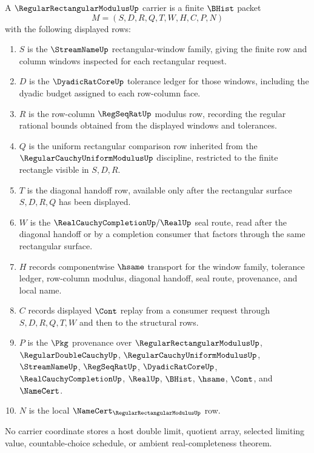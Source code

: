 \begin{definition}
\label{def:regular-rectangular-modulus-carrier}
A $\RegularRectangularModulusUp$ carrier is a finite $\BHist$ packet
$$
M=(S,D,R,Q,T,W,H,C,P,N)
$$
with the following displayed rows:
\begin{enumerate}
\item $S$ is the $\StreamNameUp$ rectangular-window family, giving the finite row and column windows inspected for each rectangular request.
\item $D$ is the $\DyadicRatCoreUp$ tolerance ledger for those windows, including the dyadic budget assigned to each row-column face.
\item $R$ is the row-column $\RegSeqRatUp$ modulus row, recording the regular rational bounds obtained from the displayed windows and tolerances.
\item $Q$ is the uniform rectangular comparison row inherited from the $\RegularCauchyUniformModulusUp$ discipline, restricted to the finite rectangle visible in $S,D,R$.
\item $T$ is the diagonal handoff row, available only after the rectangular surface $S,D,R,Q$ has been displayed.
\item $W$ is the $\RealCauchyCompletionUp/\RealUp$ seal route, read after the diagonal handoff or by a completion consumer that factors through the same rectangular surface.
\item $H$ records componentwise $\hsame$ transport for the window family, tolerance ledger, row-column modulus, diagonal handoff, seal route, provenance, and local name.
\item $C$ records displayed $\Cont$ replay from a consumer request through $S,D,R,Q,T,W$ and then to the structural rows.
\item $P$ is the $\Pkg$ provenance over $\RegularRectangularModulusUp$, $\RegularDoubleCauchyUp$, $\RegularCauchyUniformModulusUp$, $\StreamNameUp$, $\RegSeqRatUp$, $\DyadicRatCoreUp$, $\RealCauchyCompletionUp$, $\RealUp$, $\BHist$, $\hsame$, $\Cont$, and $\NameCert$.
\item $N$ is the local $\NameCert_{\RegularRectangularModulusUp}$ row.
\end{enumerate}
No carrier coordinate stores a host double limit, quotient array, selected limiting value, countable-choice schedule, or ambient real-completeness theorem.
\end{definition}

